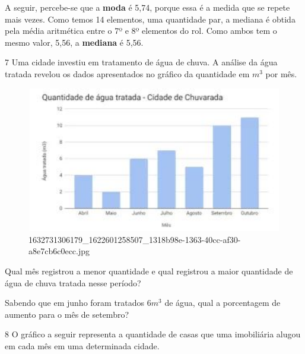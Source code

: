 {{{\begin{escolha}
{{{{{\begin{escolha}
\begin{escolha}
{\begin{q°}
{A seguir, percebe-se que a \textbf{moda} é 5,74, porque essa é a medida que se
repete mais vezes. Como temos 14 elementos, uma quantidade par, a mediana é obtida
pela média aritmética entre o 7º e 8º elementos do rol. Como ambos tem o mesmo valor, 
5,56, a \textbf{mediana} é 5,56.}

\num{7} Uma cidade investiu em tratamento de água de chuva. A análise da água
tratada revelou os dados apresentados no gráfico da quantidade em $m^3$ por
mês.

\begin{figure}
\centering
\includegraphics[width=4.95586in,height=2.50694in]{./_SAEB_9_MAT/media/image216.jpg}
\caption{1632731306179\_1622601258507\_1318b98e-1363-40cc-af30-a8e7cb6c0ecc.jpg}
\end{figure}


\begin{escolha}

  \item Qual mês registrou a menor quantidade e qual registrou a maior
  quantidade de água de chuva tratada nesse período?



  \item Sabendo que em junho foram tratados $6m^3$ de água, qual a porcentagem
  de aumento para o mês de setembro?



\end{escolha}

\num{8} O gráfico a seguir representa a quantidade de casas que uma
imobiliária alugou em cada mês em uma determinada cidade.


\end{q°}}
\end{escolha}
\end{escolha}}}}}}
\end{escolha}}}}

